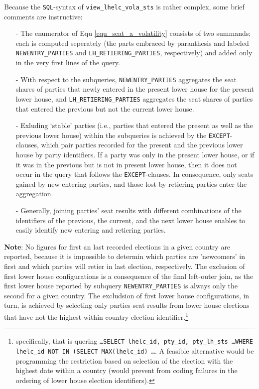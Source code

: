 Because the \texttt{\footnotesize SQL}-syntax of \texttt{\footnotesize view\_lhelc\_vola\_sts} is rather complex, some brief comments are instructive:
\begin{itemize}
\item[-]{The enumerator of Equ \ref{equ_seat_a_volatility} consists of two summands; each is computed seperately (the parts embraced by paranthesis and labeled \texttt{\footnotesize NEWENTRY\_PARTIES} and \texttt{\footnotesize LH\_RETIERING\_PARTIES}, respectively) and added only in the very first lines of the query.}
\item[-]{With respect to the subqueries, 
\texttt{\footnotesize NEWENTRY\_PARTIES} aggregates the seat shares of parties that newly entered in the present lower house for the present lower house, and 
 \texttt{\footnotesize LH\_RETIERING\_PARTIES} aggregates the seat shares of parties that entered the previous but not the current lower house.}
\item[-]{Exluding `stable' parties (i.e., parties that entered the present as well as the previous lower house) within the subqueries is achieved by the \texttt{\footnotesize EXCEPT}-clauses, which pair parties recorded for the present and the previous lower house by party identifiers. If a party was only in the present lower house, or if it was in the previous but is not in present lower house, then it does not occur in the query that follows the \texttt{\footnotesize EXCEPT}-clauses. In consequence, only seats gained by new entering parties, and those lost  by retiering parties enter the aggregation.}
\item[-]{Generally, joining parties' seat results with different combinations of the identifiers of the previous, the current, and the next lower house enables to easily identify new entering and retiering parties.}
\end{itemize}

{\bf Note}:	No figures for first an last recorded elections in a given country are reported, because it is impossible to determin which parties are 'newcomers' in first and which parties will retier in last election, respectively. The exclusion of first lower house configurations is a consequence of the final left-outer join, as the first lower house reported by subquery \texttt{\footnotesize NEWENTRY\_PARTIES} 
is always only the second for a given country. 
The excludsion of first lower house configurations, in turn, is achieved by selecting only parties seat results from lower house elections that have not the highest within country election identifier.\footnote{specifically, that is quering \texttt{\smallfont \ldots SELECT lhelc\_id, pty\_id, pty\_lh\_sts \ldots WHERE lhelc\_id NOT IN (SELECT MAX(lhelc\_id) \ldots}. A feasible alternative would be programming the restriction based on selection of the election with the highest date within a country (would prevent from coding failures in the ordering of lower house election identifiers).}



